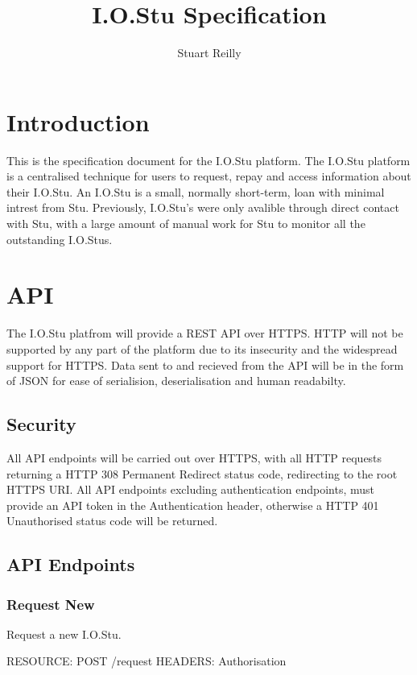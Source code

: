 \documentclass[12pt]{article}
\begin{document}
\title{I.O.Stu Specification}
\author{Stuart Reilly}
\maketitle
\newpage

\section{Introduction}
    This is the specification document for the I.O.Stu platform.
    The I.O.Stu platform is a centralised technique for users to request, repay and access information about their I.O.Stu.
    An I.O.Stu is a small, normally short-term, loan with minimal intrest from Stu.
    Previously, I.O.Stu's were only avalible through direct contact with Stu, with a large amount of manual work for Stu to monitor all the outstanding I.O.Stus.

\section{API}
    The I.O.Stu platfrom will provide a REST API over HTTPS.
    HTTP will not be supported by any part of the platform due to its insecurity and the widespread support for HTTPS.
    Data sent to and recieved from the API will be in the form of JSON for ease of serialision, deserialisation and human readabilty.

    \subsection{Security}
    All API endpoints will be carried out over HTTPS, with all HTTP requests returning a HTTP 308 Permanent Redirect status code, redirecting to the root HTTPS URI.
    All API endpoints excluding authentication endpoints, must provide an API token in the Authentication header, otherwise a HTTP 401 Unauthorised status code will be returned.

    \subsection{API Endpoints}
        \subsubsection{Request New}
        Request a new I.O.Stu.

        RESOURCE: POST /request
        HEADERS: Authorisation
\end{document}
